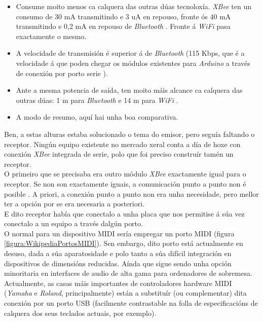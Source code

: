   \begin{itemize}
   \item Consume moito menos ca calquera das outras dúas tecnoloxía.
         \textit{XBee} ten un consumo de 30 mA transmitindo e 3 uA en repouso,
         fronte ós 40 mA transmitindo e 0,2 mA en repouso de \textit{Bluetooth}
         \cite{ZigBee}. Fronte á \textit{WiFi} pasa exactamente o mesmo.
   \item A velocidade de transmisión é superior á de \textit{Bluetooth}
         (115 Kbps, que é a velocidade á que poden chegar os módulos existentes
         para \textit{Arduino} a través de conexión por porto serie
         \cite{ArduinoBluetooth}).
   \item Ante a mesma potencia de saída, ten moito máis alcance ca calquera das
         outras dúas: 1 m para \textit{Bluetooth} \cite{Bluetooth} e 14 m para
         \textit{WiFi} \cite{WiFi}.
   \item A modo de resumo, aquí \cite{ComparativaZigBee} hai unha boa
         comparativa.
  \end{itemize}

  Ben, a estas alturas estaba solucionado o tema do emisor, pero seguía
  faltando o receptor. Ningún equipo existente no mercado xeral conta a día de
  hoxe con conexión \textit{XBee} integrada de serie, polo que foi preciso
  construír tamén un receptor. \\

  O primeiro que se precisaba era outro módulo \textit{XBee} exactamente igual
  para o receptor. Se non son exactamente iguais, a comunicación punto a punto
  non é posible \cite{ComunicacionXBee}. A priori, a conexión punto a punto non
  era unha necesidade, pero mellor ter a opción por se era necesaria a
  posteriori. \\

  E dito receptor había que conectalo a unha placa que nos permitise á súa vez
  conectalo a un equipo a través dalgún porto. \\

  O normal para un dispositivo MIDI sería empregar un porto MIDI (figura
  \ref{figura:WikipediaPortosMIDI}). Sen embargo, dito porto está actualmente
  en desuso, dada a súa aparatosidade e polo tanto a súa difícil integración en
  dispositivos de dimensións reducidas. Aínda que sigue sendo unha opción
  minoritaria en interfaces de audio de alta gama para ordenadores de
  sobremesa. Actualmente, as casas máis importantes de controladores hardware
  MIDI (\textit{Yamaha} e \textit{Roland}, principalmente) están a substituír
  (ou complementar) dita conexión por un porto USB (facilmente contrastable na
  folla de especificacións de calquera dos seus teclados actuais, por exemplo). \\

